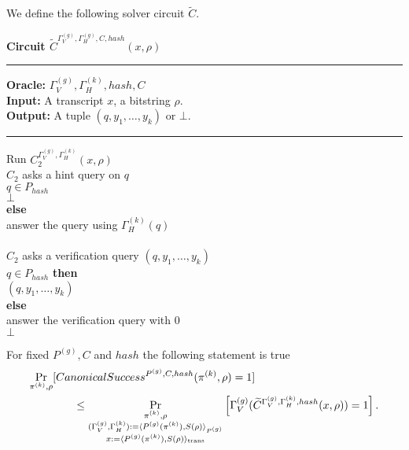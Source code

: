 %
We define the following solver circuit $\widetilde{C}$.
\begin{codeblock}
  \textbf{Circuit $\widetilde{C}^{\Gamma_V^{(g)}, \Gamma_H^{(g)}, C, hash} (x, \rho)$}
  \medskip \hrule \medskip
  \textbf{Oracle:} $\Gamma_V^{(g)}, \Gamma_H^{(k)}, hash, C$ \\
  \textbf{Input:} A transcript $x$, a bitstring $\rho$. \\
  \textbf{Output:} A tuple $(q, y_1, \dots, y_k)$ or $\bot$.
  \medskip\hrule\medskip
  Run $C_2^{\Gamma_V^{(g)},\Gamma_H^{(k)}}(x, \rho)$ \\
  \IndI \If $C_2$ asks a hint query on $q$ \then\\
  \IndII \If $q \in P_{hash}$ \then\\
  \IndIII \return $\bot$\\
  \IndII \textbf{else}\\
  \IndIII answer the query using $\Gamma_H^{(k)}(q)$\\
  \\
  \IndI \If $C_2$ asks a verification query $(q, y_1, \dots, y_k)$ \then \\
  \IndII \If $q \in P_{hash}$ \textbf{then} \\
  \IndIII \return $(q, y_1, \dots, y_k)$ \\
  \IndII \textbf{else} \\
  \IndIII answer the verification query with 0 \\
  \return $\bot$
\end{codeblock}
%
\begin{lemma}
  \label{lemma:ctilda_c}
  For fixed $P^{(g)}, C$ and $hash$ the following statement is true
  \begin{align*}
    &\underset{\pi^{(k)}, \rho}{\Pr}[CanonicalSuccess^{P^{(g)}, C, hash}(\pi^{(k)}, \rho) = 1] \\
    &\mbox\qquad\qquad \leq \underset{\substack{ \pi^{(k)}, \rho \\
        (\Gamma_V^{(g)}, \Gamma_H^{(k)}) := \langle P^{(g)}(\pi^{(k)}), S(\rho) \rangle_{P^{(g)}} \\
        x:= \langle P^{(g)}(\pi^{(k)}), S(\rho) \rangle_{\text{trans}}}}
  {\Pr}\left[\Gamma_V^{(g)} (\widetilde{C}^{\Gamma_V^{(g)}, \Gamma_H^{(k)}, hash}(x, \rho)) = 1\right].
  \end{align*}
\end{lemma}
%
